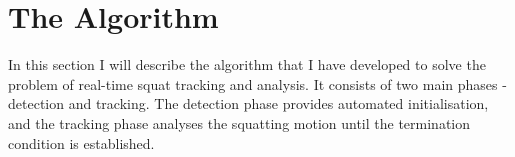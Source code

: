 \section{The Algorithm}

In this section I will describe the algorithm that I have developed to solve the problem of real-time squat tracking and analysis. It consists of two main phases - detection and tracking. The detection phase provides automated initialisation, and the tracking phase analyses the squatting motion until the termination condition is established.


